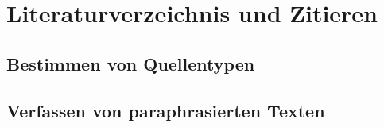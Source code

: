 \section{Literaturverzeichnis und Zitieren}

\subsection{Bestimmen von Quellentypen}
\lipsum[1-2]

\subsection{Verfassen von paraphrasierten Texten}
\lipsum[1-2]
